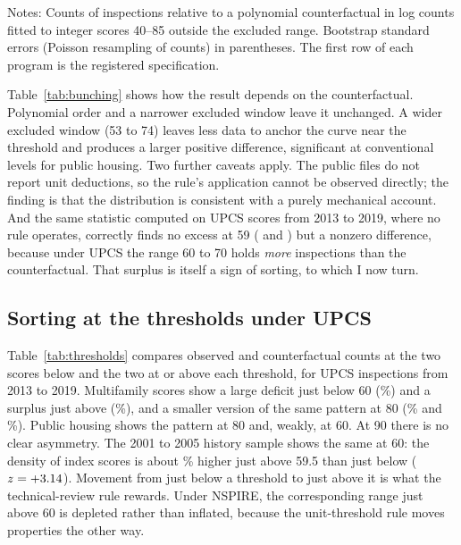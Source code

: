 \documentclass[11pt,letterpaper]{article}
\begin{document}
\begin{table}[t]
\centering\small
\caption{Excess mass at 59 and missing mass at 60--70}\label{tab:bunching}

\par\vspace{0.5ex}\footnotesize\raggedright Notes: Counts of inspections relative to a polynomial counterfactual in log counts fitted to integer scores 40--85 outside the excluded range. Bootstrap standard errors (Poisson resampling of counts) in parentheses. The first row of each program is the registered specification.
\end{table}

Table~\ref{tab:bunching} shows how the result depends on the counterfactual. Polynomial order and a narrower excluded window leave it unchanged. A wider excluded window (53 to 74) leaves less data to anchor the curve near the threshold and produces a larger positive difference, significant at conventional levels for public housing. Two further caveats apply. The public files do not report unit deductions, so the rule's application cannot be observed directly; the finding is that the distribution is consistent with a purely mechanical account. And the same statistic computed on UPCS scores from 2013 to 2019, where no rule operates, correctly finds no excess at 59 (\upcsExcMf{} and \upcsExcPh) but a nonzero difference, because under UPCS the range 60 to 70 holds \emph{more} inspections than the counterfactual. That surplus is itself a sign of sorting, to which I now turn.

\subsection{Sorting at the thresholds under UPCS}
Table~\ref{tab:thresholds} compares observed and counterfactual counts at the two scores below and the two at or above each threshold, for UPCS inspections from 2013 to 2019. Multifamily scores show a large deficit just below 60 (\thrMfSixtyBelow\%) and a surplus just above (\thrMfSixtyAbove\%), and a smaller version of the same pattern at 80 (\thrMfEightyBelow\% and \thrMfEightyAbove\%). Public housing shows the pattern at 80 and, weakly, at 60. At 90 there is no clear asymmetry. The 2001 to 2005 history sample shows the same at 60: the density of index scores is about \histDensPct\% higher just above 59.5 than just below ($z=+3.14$). Movement from just below a threshold to just above it is what the technical-review rule rewards. Under NSPIRE, the corresponding range just above 60 is depleted rather than inflated, because the unit-threshold rule moves properties the other way.
\end{document}
